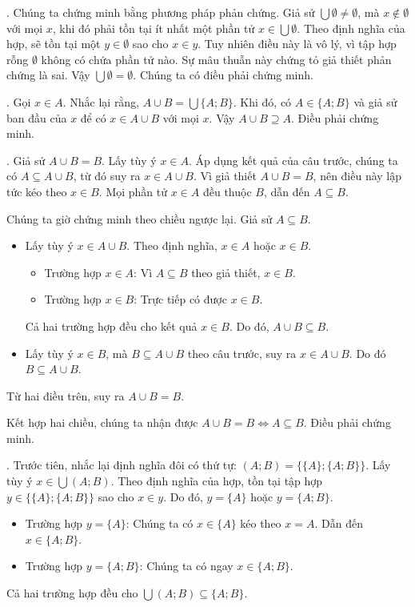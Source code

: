 . Chúng ta chứng minh bằng phương pháp phản chứng. Giả sử $\bigcup \emptyset \neq \emptyset$, mà $x \notin \emptyset$ với mọi $x$, khi đó phải tồn tại ít nhất một phần tử $x \in \bigcup \emptyset$. Theo định nghĩa của hợp, sẽ tồn tại một $y \in \emptyset$ sao cho $x \in y$. Tuy nhiên điều này là vô lý, vì tập hợp rỗng $\emptyset$ không có chứa phần tử nào. Sự mâu thuẫn này chứng tỏ giả thiết phản chứng là sai. Vậy $\bigcup \emptyset = \emptyset$. Chúng ta có điều phải chứng minh.

. Gọi $x \in A$. Nhắc lại rằng, $A \cup B = \bigcup \{A; B\}$. Khi đó, có $A \in \{A; B\}$ và giả sử ban đầu của $x$ để có $x \in A \cup B$ với mọi $x$. Vậy $A \cup B \supseteq A$. Điều phải chứng minh.

. Giả sử $A \cup B = B$. Lấy tùy ý $x \in A$. Áp dụng kết quả của câu trước, chúng ta có $A \subseteq A \cup B$, từ đó suy ra $x \in A \cup B$. Vì giả thiết $A \cup B = B$, nên điều này lập tức kéo theo $x \in B$. Mọi phần tử $x \in A$ đều thuộc $B$, dẫn đến $A \subseteq B$.

Chúng ta giờ chứng minh theo chiều ngược lại. Giả sử $A \subseteq B$.
\begin{itemize}
   \item Lấy tùy ý $x \in A \cup B$. Theo định nghĩa, $x \in A$ hoặc $x \in B$.
         \begin{itemize}
            \item \textcolor{colorEmphasis}{Trường hợp $x \in A$}: Vì $A \subseteq B$ theo giả thiết, $x \in B$.
            \item \textcolor{colorEmphasisCyan}{Trường hợp $x \in B$}: Trực tiếp có được $x \in B$.
         \end{itemize}
         Cả hai trường hợp đều cho kết quả $x \in B$. Do đó, $A \cup B \subseteq B$.
   \item Lấy tùy ý $x \in B$, mà $B \subseteq A \cup B$ theo câu trước, suy ra $x \in A \cup B$. Do đó $B \subseteq A \cup B$.
\end{itemize}
Từ hai điều trên, suy ra $A \cup B = B$.

Kết hợp hai chiều, chúng ta nhận được $A \cup B = B \iff A \subseteq B$. Điều phải chứng minh.

. Trước tiên, nhắc lại định nghĩa đôi có thứ tự: $(A; B) = \big\{ \{A\}; \{A; B\} \big\}$. Lấy tùy ý $x \in \bigcup (A; B)$. Theo định nghĩa của hợp, tồn tại tập hợp $y \in \big\{ \{A\}; \{A; B\} \big\}$ sao cho $x \in y$. Do đó, $y = \{A\}$ hoặc $y = \{A; B\}$.
\begin{itemize}
   \item \textcolor{colorEmphasis}{Trường hợp $y = \{A\}$}: Chúng ta có $x \in \{A\}$ kéo theo $x = A$. Dẫn đến $x \in \{A; B\}$.
   \item \textcolor{colorEmphasisCyan}{Trường hợp $y = \{A; B\}$}: Chúng ta có ngay $x \in \{A; B\}$.
\end{itemize}
Cả hai trường hợp đều cho $\bigcup (A; B) \subseteq \{A; B\}$.

